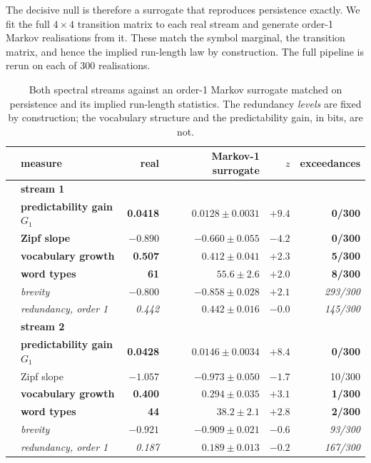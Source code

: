 \documentclass[11pt,a4paper]{article}
\newcommand{\bnum}[1]{\textbf{#1}}
\begin{document}
The decisive null is therefore a surrogate that reproduces persistence exactly. We fit
the full $4 \times 4$ transition matrix to each real stream and generate order-1 Markov
realisations from it. These match the symbol marginal, the transition matrix, and hence
the implied run-length law by construction. The full pipeline is rerun on each of 300
realisations.

\begin{table}[htbp]
\centering
\caption{Both spectral streams against an order-1 Markov surrogate matched on
persistence and its implied run-length statistics. The redundancy \emph{levels} are
fixed by construction; the vocabulary structure and the predictability gain, in bits,
are not.}
\label{tab:markov}
\small
\begin{tabular}{llrrrr}
\toprule
 & measure & real & Markov-1 surrogate & $z$ & exceedances \\
\midrule
 & \multicolumn{5}{l}{\textbf{stream 1}} \\
 & \bnum{predictability gain $G_1$} & \bnum{0.0418} & $0.0128 \pm 0.0031$ & $\mathbf{+9.4}$ & \bnum{0/300} \\
 & \bnum{Zipf slope} & $\mathbf{-0.890}$ & $-0.660 \pm 0.055$ & $\mathbf{-4.2}$ & \bnum{0/300} \\
 & \bnum{vocabulary growth} & \bnum{0.507} & $0.412 \pm 0.041$ & $\mathbf{+2.3}$ & \bnum{5/300} \\
 & \bnum{word types} & \bnum{61} & $55.6 \pm 2.6$ & $\mathbf{+2.0}$ & \bnum{8/300} \\
 & \emph{brevity} & \emph{$-0.800$} & \emph{$-0.858 \pm 0.028$} & \emph{$+2.1$} & \emph{293/300} \\
 & \emph{redundancy, order 1} & \emph{0.442} & \emph{$0.442 \pm 0.016$} & \emph{$-0.0$} & \emph{145/300} \\
\midrule
 & \multicolumn{5}{l}{\textbf{stream 2}} \\
 & \bnum{predictability gain $G_1$} & \bnum{0.0428} & $0.0146 \pm 0.0034$ & $\mathbf{+8.4}$ & \bnum{0/300} \\
 & Zipf slope & $-1.057$ & $-0.973 \pm 0.050$ & $-1.7$ & 10/300 \\
 & \bnum{vocabulary growth} & \bnum{0.400} & $0.294 \pm 0.035$ & $\mathbf{+3.1}$ & \bnum{1/300} \\
 & \bnum{word types} & \bnum{44} & $38.2 \pm 2.1$ & $\mathbf{+2.8}$ & \bnum{2/300} \\
 & \emph{brevity} & \emph{$-0.921$} & \emph{$-0.909 \pm 0.021$} & \emph{$-0.6$} & \emph{93/300} \\
 & \emph{redundancy, order 1} & \emph{0.187} & \emph{$0.189 \pm 0.013$} & \emph{$-0.2$} & \emph{167/300} \\
\bottomrule
\end{tabular}
\end{table}
\end{document}
